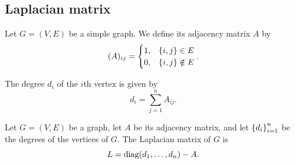 \documentclass[11pt,a4paper]{article}
\begin{document}
\subsection{Laplacian matrix}
\begin{definition}
  Let $G = (V,E)$ be a simple graph.
  We define its adjacency matrix $A$ by
  \[
    (A)_{ij} =
    \begin{cases}
      1, &\left\{i,j\right\} \in E \\
      0, &\left\{i,j\right\} \notin E
    \end{cases}.
  \]
\end{definition}
\begin{remark}
  The degree $d_i$ of the $i$th vertex is given by
  \[
    d_i = \sum_{j=1}^{n} A_{ij}.
  \]
\end{remark}
\begin{definition}
  Let $G = (V,E)$ be a graph,
  let $A$ be its adjacency matrix,
  and let $\left\{d_i\right\}_{i=1}^{n}$ be the degrees of the vertices of $G$.
  The Laplacian matrix of $G$ is
  \[
    L = \operatorname{diag}(d_1,\dots,d_n) - A.
  \]
\end{definition}
\end{document}
